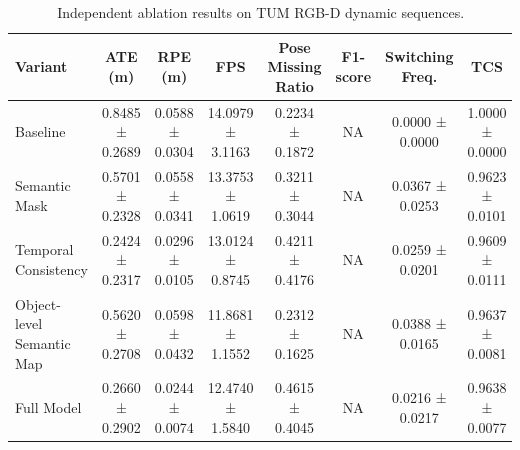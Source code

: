 \begin{table}[htbp]
\centering
\caption{Independent ablation results on TUM RGB-D dynamic sequences.}
\label{tab:independent_ablation_new}
\begin{tabular}{lccccccc}
\toprule
Variant & ATE (m) & RPE (m) & FPS & Pose Missing Ratio & F1-score & Switching Freq. & TCS \\
\midrule
Baseline & 0.8485 ± 0.2689 & 0.0588 ± 0.0304 & 14.0979 ± 3.1163 & 0.2234 ± 0.1872 & NA & 0.0000 ± 0.0000 & 1.0000 ± 0.0000 \\
Semantic Mask & 0.5701 ± 0.2328 & 0.0558 ± 0.0341 & 13.3753 ± 1.0619 & 0.3211 ± 0.3044 & NA & 0.0367 ± 0.0253 & 0.9623 ± 0.0101 \\
Temporal Consistency & 0.2424 ± 0.2317 & 0.0296 ± 0.0105 & 13.0124 ± 0.8745 & 0.4211 ± 0.4176 & NA & 0.0259 ± 0.0201 & 0.9609 ± 0.0111 \\
Object-level Semantic Map & 0.5620 ± 0.2708 & 0.0598 ± 0.0432 & 11.8681 ± 1.1552 & 0.2312 ± 0.1625 & NA & 0.0388 ± 0.0165 & 0.9637 ± 0.0081 \\
Full Model & 0.2660 ± 0.2902 & 0.0244 ± 0.0074 & 12.4740 ± 1.5840 & 0.4615 ± 0.4045 & NA & 0.0216 ± 0.0217 & 0.9638 ± 0.0077 \\
\bottomrule
\end{tabular}
\end{table}
